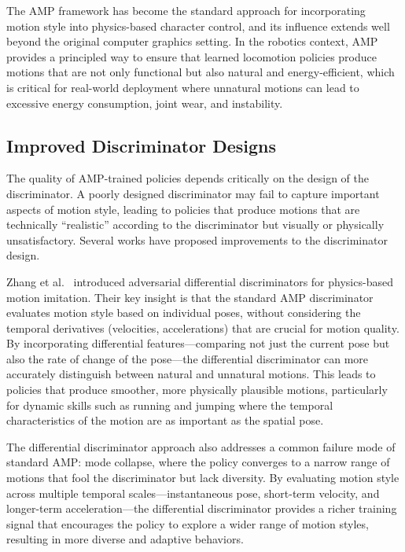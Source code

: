 The AMP framework has become the standard approach for incorporating motion style into physics-based character control, and its influence extends well beyond the original computer graphics setting. In the robotics context, AMP provides a principled way to ensure that learned locomotion policies produce motions that are not only functional but also natural and energy-efficient, which is critical for real-world deployment where unnatural motions can lead to excessive energy consumption, joint wear, and instability.

\subsection{Improved Discriminator Designs}

The quality of AMP-trained policies depends critically on the design of the discriminator. A poorly designed discriminator may fail to capture important aspects of motion style, leading to policies that produce motions that are technically ``realistic'' according to the discriminator but visually or physically unsatisfactory. Several works have proposed improvements to the discriminator design.

Zhang et al.~\cite{zhang2024advdiscriminators} introduced adversarial differential discriminators for physics-based motion imitation. Their key insight is that the standard AMP discriminator evaluates motion style based on individual poses, without considering the temporal derivatives (velocities, accelerations) that are crucial for motion quality. By incorporating differential features---comparing not just the current pose but also the rate of change of the pose---the differential discriminator can more accurately distinguish between natural and unnatural motions. This leads to policies that produce smoother, more physically plausible motions, particularly for dynamic skills such as running and jumping where the temporal characteristics of the motion are as important as the spatial pose.

The differential discriminator approach also addresses a common failure mode of standard AMP: mode collapse, where the policy converges to a narrow range of motions that fool the discriminator but lack diversity. By evaluating motion style across multiple temporal scales---instantaneous pose, short-term velocity, and longer-term acceleration---the differential discriminator provides a richer training signal that encourages the policy to explore a wider range of motion styles, resulting in more diverse and adaptive behaviors.

